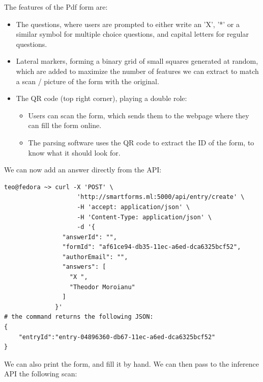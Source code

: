 \documentclass[12pt, a4paper]{report}
\begin{document}
The features of the Pdf form are:
\begin{itemize}
    \item The questions, where users are prompted to either write an 'X', '*' or a similar symbol for multiple choice questions, and capital letters for regular questions.
    \item Lateral markers, forming a binary grid of small squares generated at random, which are added to maximize the number of features we can extract to match a scan / picture of the form with the original.
    \item The QR code (top right corner), playing a double role:
    \begin{itemize}
        \item Users can scan the form, which sends them to the webpage where they can fill the form online.
        \item The parsing software uses the QR code to extract the ID of the form, to know what it should look for.
    \end{itemize}
\end{itemize}

We can now add an answer directly from the API:

\begin{verbatim}
teo@fedora ~> curl -X 'POST' \
                    'http://smartforms.ml:5000/api/entry/create' \
                    -H 'accept: application/json' \
                    -H 'Content-Type: application/json' \
                    -d '{
                "answerId": "",
                "formId": "af61ce94-db35-11ec-a6ed-dca6325bcf52",
                "authorEmail": "",
                "answers": [
                  "X ",
                  "Theodor Moroianu"
                ]
              }'
# the command returns the following JSON:
{
    "entryId":"entry-04896360-db67-11ec-a6ed-dca6325bcf52"
}
\end{verbatim}

We can also print the form, and fill it by hand. We can then pass to the inference API the following scan:
\end{document}
